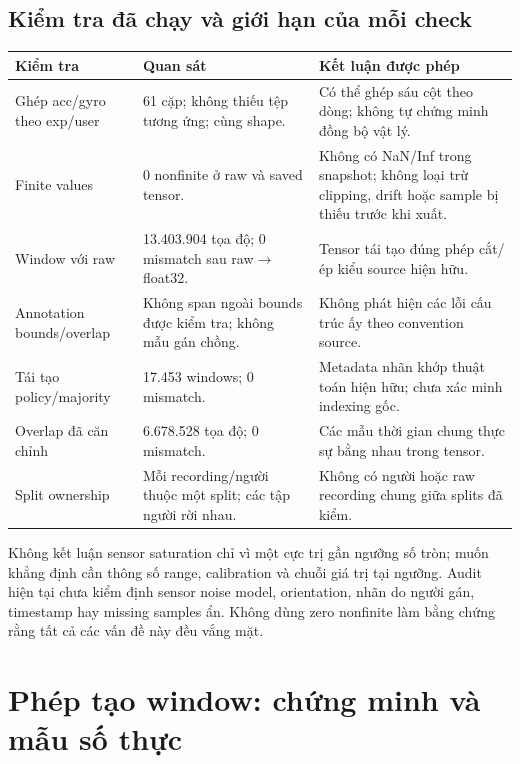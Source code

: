 \documentclass[11pt,a4paper]{article}
\theoremstyle{definition}
\begin{document}
\subsection{Kiểm tra đã chạy và giới hạn của mỗi check}
\begin{longtable}{@{}P{4cm}P{3cm}P{5.6cm}@{}}\toprule
Kiểm tra & Quan sát & Kết luận được phép\\\midrule\endhead
Ghép acc/gyro theo exp/user & 61 cặp; không thiếu tệp tương ứng; cùng shape. & Có thể ghép sáu cột theo dòng; không tự chứng minh đồng bộ vật lý.\\
Finite values & 0 nonfinite ở raw và saved tensor. & Không có NaN/Inf trong snapshot; không loại trừ clipping, drift hoặc sample bị thiếu trước khi xuất.\\
Window với raw & 13.403.904 tọa độ; 0 mismatch sau raw$\to$float32. & Tensor tái tạo đúng phép cắt/ép kiểu source hiện hữu.\\
Annotation bounds/overlap & Không span ngoài bounds được kiểm tra; không mẫu gán chồng. & Không phát hiện các lỗi cấu trúc ấy theo convention source.\\
Tái tạo policy/majority & 17.453 windows; 0 mismatch. & Metadata nhãn khớp thuật toán hiện hữu; chưa xác minh indexing gốc.\\
Overlap đã căn chỉnh & 6.678.528 tọa độ; 0 mismatch. & Các mẫu thời gian chung thực sự bằng nhau trong tensor.\\
Split ownership & Mỗi recording/người thuộc một split; các tập người rời nhau. & Không có người hoặc raw recording chung giữa splits đã kiểm.\\\bottomrule
\end{longtable}

Không kết luận sensor saturation chỉ vì một cực trị gần ngưỡng số tròn;
muốn khẳng định cần thông số range, calibration và chuỗi giá trị tại ngưỡng.
Audit hiện tại chưa kiểm định sensor noise model, orientation, nhãn do người
gán, timestamp hay missing samples ẩn. Không dùng zero nonfinite làm bằng
chứng rằng tất cả các vấn đề này đều vắng mặt.

\section{Phép tạo window: chứng minh và mẫu số thực}
\end{document}
